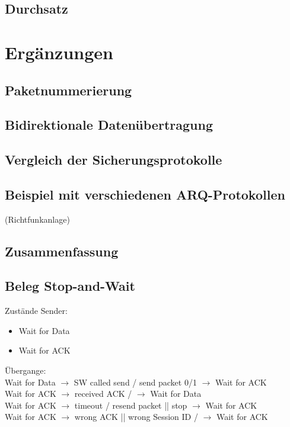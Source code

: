 \subsection{Durchsatz}

\section{Ergänzungen}
\subsection{Paketnummerierung}
\subsection{Bidirektionale Datenübertragung}
\subsection{Vergleich der Sicherungsprotokolle}
\subsection{Beispiel mit verschiedenen ARQ-Protokollen}
(Richtfunkanlage)
\subsection{Zusammenfassung}
\subsection{Beleg Stop-and-Wait}
Zustände Sender:
\begin{itemize}
\item Wait for Data
\item Wait for ACK
\end{itemize}
Übergange:\\
Wait for Data $\to$ SW called send / send packet 0/1 $\to$ Wait for ACK\\
Wait for ACK $\to$ received ACK /  $\to$ Wait for Data\\
Wait for ACK $\to$ timeout / resend packet || stop $\to$ Wait for ACK \\
Wait for ACK $\to$ wrong ACK || wrong Session ID / $\to$ Wait for ACK













